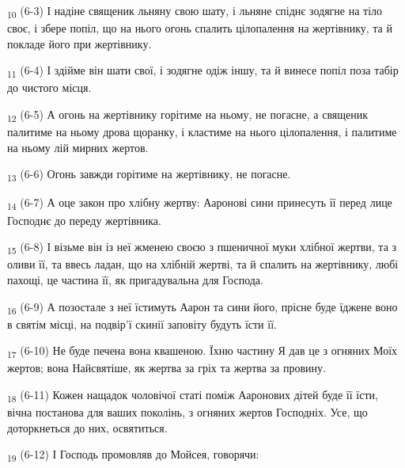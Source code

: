 \begin{tcolorbox}
\textsubscript{10} (6-3) І надіне священик льняну свою шату, і льняне спіднє зодягне на тіло своє, і збере попіл, що на нього огонь спалить цілопалення на жертівнику, та й покладе його при жертівнику.
\end{tcolorbox}
\begin{tcolorbox}
\textsubscript{11} (6-4) І здійме він шати свої, і зодягне одіж іншу, та й винесе попіл поза табір до чистого місця.
\end{tcolorbox}
\begin{tcolorbox}
\textsubscript{12} (6-5) А огонь на жертівнику горітиме на ньому, не погасне, а священик палитиме на ньому дрова щоранку, і кластиме на нього цілопалення, і палитиме на ньому лій мирних жертов.
\end{tcolorbox}
\begin{tcolorbox}
\textsubscript{13} (6-6) Огонь завжди горітиме на жертівнику, не погасне.
\end{tcolorbox}
\begin{tcolorbox}
\textsubscript{14} (6-7) А оце закон про хлібну жертву: Ааронові сини принесуть її перед лице Господнє до переду жертівника.
\end{tcolorbox}
\begin{tcolorbox}
\textsubscript{15} (6-8) І візьме він із неї жменею своєю з пшеничної муки хлібної жертви, та з оливи її, та ввесь ладан, що на хлібній жертві, та й спалить на жертівнику, любі пахощі, це частина її, як пригадувальна для Господа.
\end{tcolorbox}
\begin{tcolorbox}
\textsubscript{16} (6-9) А позостале з неї їстимуть Аарон та сини його, прісне буде їджене воно в святім місці, на подвір'ї скинії заповіту будуть їсти її.
\end{tcolorbox}
\begin{tcolorbox}
\textsubscript{17} (6-10) Не буде печена вона квашеною. Їхню частину Я дав це з огняних Моїх жертов; вона Найсвятіше, як жертва за гріх та жертва за провину.
\end{tcolorbox}
\begin{tcolorbox}
\textsubscript{18} (6-11) Кожен нащадок чоловічої статі поміж Ааронових дітей буде її їсти, вічна постанова для ваших поколінь, з огняних жертов Господніх. Усе, що доторкнеться до них, освятиться.
\end{tcolorbox}
\begin{tcolorbox}
\textsubscript{19} (6-12) І Господь промовляв до Мойсея, говорячи:
\end{tcolorbox}
